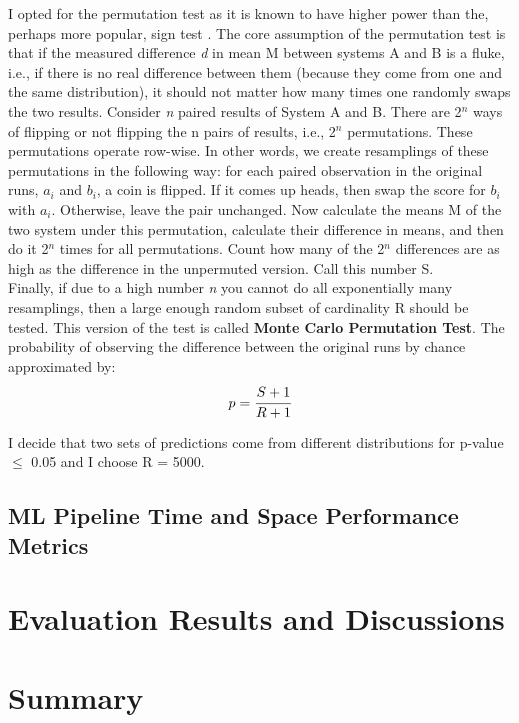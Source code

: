     I opted for the permutation test as it is known to have higher power than the, perhaps more popular, sign test \cite{signtest}. The core assumption of the permutation test is that if the measured difference \textit{d} in mean M between systems A and B is a fluke, i.e., if there is no real difference between them (because they come from one and the same distribution), it should not matter how many times one randomly swaps the two results. Consider \textit{n} paired results of System A and B. There are 2$^n$ ways of flipping or not flipping the n pairs of results, i.e., 2$^n$ permutations. These permutations operate row-wise. In other words, we create resamplings of these permutations in the following way: for each paired observation in the original runs, $a_i$ and $b_i$, a coin is flipped. If it comes up heads, then swap the score for $b_i$ with $a_i$. Otherwise, leave the pair unchanged. Now calculate the means M of the two system under this permutation, calculate their difference in means, and then do it 2$^n$ times for all permutations. Count how many of the 2$^n$ differences are as high as the difference in the unpermuted version. Call this number S. \\
    
    Finally, if due to a high number \textit{n} you cannot do all exponentially many resamplings, then a large enough random subset of cardinality R should be tested. This version of the test is called \textbf{Monte Carlo Permutation Test}. The probability of observing the difference between the original runs by chance approximated by: \\
    
    \begin{equation}
        p = \cfrac{S + 1}{R + 1}
    \end{equation}

    \smallskip
    
    I decide that two sets of predictions come from different distributions for p-value $\leq$ 0.05 and I choose R = 5000.
    
    \subsection{ML Pipeline Time and Space Performance Metrics}
    
    \section{Evaluation Results and Discussions} \label{Evaluation Results}
    
    \section{Summary}
    
